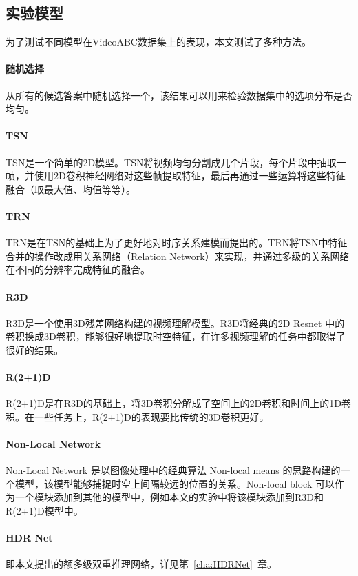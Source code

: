 \subsection{实验模型}
为了测试不同模型在VideoABC数据集上的表现，本文测试了多种方法。
\paragraph{随机选择} 从所有的候选答案中随机选择一个，该结果可以用来检验数据集中的选项分布是否均匀。
\paragraph{TSN\cite{wang2016temporal}}TSN是一个简单的2D模型。TSN将视频均匀分割成几个片段，每个片段中抽取一帧，并使用2D卷积神经网络对这些帧提取特征，最后再通过一些运算将这些特征融合（取最大值、均值等等）。

\paragraph{TRN\cite{zhou2018temporal}} TRN是在TSN的基础上为了更好地对时序关系建模而提出的。TRN将TSN中特征合并的操作改成用关系网络（Relation Network）来实现，并通过多级的关系网络在不同的分辨率完成特征的融合。

\paragraph{R3D\cite{tran2018closer}} R3D是一个使用3D残差网络构建的视频理解模型。R3D将经典的2D Resnet 中的卷积换成3D卷积，能够很好地提取时空特征，在许多视频理解的任务中都取得了很好的结果。

\paragraph{R(2+1)D\cite{tran2018closer}} R(2+1)D是在R3D的基础上，将3D卷积分解成了空间上的2D卷积和时间上的1D卷积。在一些任务上，R(2+1)D的表现要比传统的3D卷积更好。

\paragraph{Non-Local Network\cite{wang2018non}} Non-Local Network 是以图像处理中的经典算法 Non-local means 的思路构建的一个模型，该模型能够捕捉时空上间隔较远的位置的关系。Non-local block 可以作为一个模块添加到其他的模型中，例如本文的实验中将该模块添加到R3D和R(2+1)D模型中。

\paragraph{HDR Net} 即本文提出的额多级双重推理网络，详见第~\ref{cha:HDRNet}~章。
